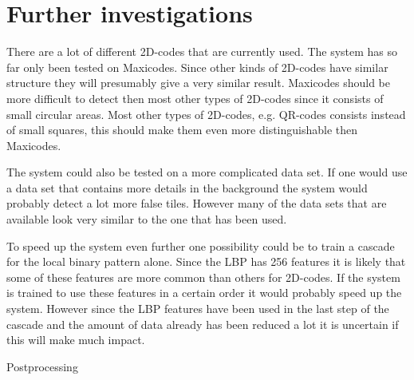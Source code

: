 \chapter{Further investigations}
\label{sec:Further investigations}
There are a lot of different 2D-codes that are currently used. The system has so far only been tested on Maxicodes. Since other kinds of 2D-codes have similar structure they will presumably give a very similar result. Maxicodes should be more difficult to detect then most other types of 2D-codes since it consists of small circular areas. Most other types of 2D-codes, e.g. QR-codes consists instead of small squares, this should make them even more distinguishable then Maxicodes.

The system could also be tested on a more complicated data set. If one would use a data set that contains more details in the background the system would probably detect a lot more false tiles. However many of the data sets that are available look very similar to the one that has been used.

To speed up the system even further one possibility could be to train a cascade for the local binary pattern alone. Since the LBP has 256 features it is likely that some of these features are more common than others for 2D-codes. If the system is trained to use these features in a certain order it would probably speed up the system. However since the LBP features have been used in the last step of the cascade and the amount of data already has been reduced a lot it is uncertain if this will make much impact.

Postprocessing 
